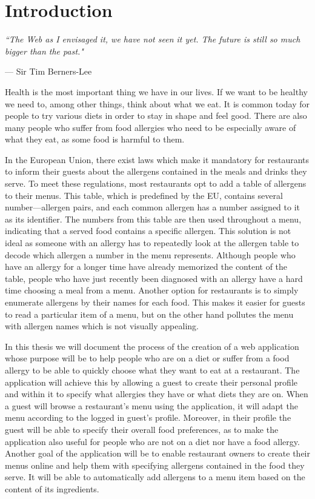 \setlength{\epigraphwidth}{.5\textwidth}
\setlength\epigraphrule{0pt}

\chapter*{Introduction}

\epigraph{\textit{``The Web as I envisaged it, we have not seen it yet. The future is still so much bigger than the past."}}{--- Sir Tim Berners-Lee}

\noindent Health is the most important thing we have in our lives.
If we want to be healthy we need to, among other things, think about what we eat.
It is common today for people to try various diets in order to stay in shape and feel good.
There are also many people who suffer from food allergies who need to be especially aware of what they eat, as some food is harmful to them.

In the European Union, there exist laws which make it mandatory for restaurants to inform their guests about the allergens contained in the meals and drinks they serve.
To meet these regulations, most restaurants opt to add a table of allergens to their menus.
This table, which is predefined by the EU, contains several number---allergen pairs, and each common allergen has a number assigned to it as its identifier.
The numbers from this table are then used throughout a menu, indicating that a served food contains a specific allergen.
This solution is not ideal as someone with an allergy has to repeatedly look at the allergen table to decode which allergen a number in the menu represents.
Although people who have an allergy for a longer time have already memorized the content of the table, people who have just recently been diagnosed with an allergy have a hard time choosing a meal from a menu.
Another option for restaurants is to simply enumerate allergens by their names for each food.
This makes it easier for guests to read a particular item of a menu, but on the other hand pollutes the menu with allergen names which is not visually appealing.

In this thesis we will document the process of the creation of a web application whose purpose will be to help people who are on a diet or suffer from a food allergy to be able to quickly choose what they want to eat at a restaurant.
The application will achieve this by allowing a guest to create their personal profile and within it to specify what allergies they have or what diets they are on. 
When a guest will browse a restaurant's menu using the application, it will adapt the menu according to the logged in guest's profile.
Moreover, in their profile the guest will be able to specify their overall food preferences, as to make the application also useful for people who are not on a diet nor have a food allergy.
Another goal of the application will be to enable restaurant owners to create their menus online and help them with specifying allergens contained in the food they serve.
It will be able to automatically add allergens to a menu item based on the content of its ingredients.

